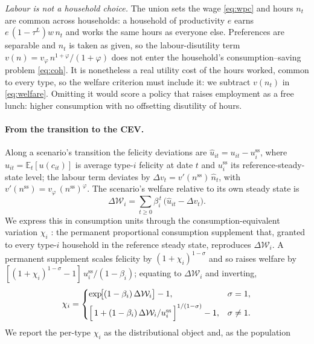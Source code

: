 \emph{Labour is not a household choice.} The union sets the wage \eqref{eq:wpc} and
hours $n_t$ are common across households: a household of productivity $e$ earns
$e\,(1-\tau^L)w\,n_t$ and works the same hours as everyone else. Preferences are
separable and $n_t$ is taken as given, so the labour-disutility term
$v(n)=v_\varphi\,n^{1+\varphi}/(1+\varphi)$ does not enter the household's
consumption--saving problem \eqref{eq:coh}. It is nonetheless a real utility cost of
the hours worked, common to every type, so the welfare criterion must include it: we
subtract $v(n_t)$ in \eqref{eq:welfare}. Omitting it would score a policy that raises
employment as a free lunch: higher consumption with no offsetting disutility of
hours.

\paragraph{From the transition to the CEV.} Along a scenario's transition the
felicity deviations are $\widehat{u}_{it}=u_{it}-u^{\mathrm{ss}}_i$, where
$u_{it}=\mathbb{E}_t[u(c_{it})]$ is average type-$i$ felicity at date $t$ and
$u^{\mathrm{ss}}_i$ its reference-steady-state level; the labour term deviates by
$\Delta v_t=v'(n^{\mathrm{ss}})\,\widehat{n}_t$, with
$v'(n^{\mathrm{ss}})=v_\varphi\,(n^{\mathrm{ss}})^{\varphi}$. The scenario's welfare
relative to its own steady state is
%
\begin{equation}
  \Delta\mathcal{W}_i=\sum_{t\ge0}\beta_i^{\,t}\,\bigl(\widehat{u}_{it}-\Delta v_t\bigr).
  \label{eq:dW}
\end{equation}
%
We express this in consumption units through the consumption-equivalent variation
$\chi_i$ \citep{Lucas1987}: the permanent proportional consumption supplement that,
granted to every type-$i$ household in the reference steady state, reproduces
$\Delta\mathcal{W}_i$. A permanent supplement scales felicity by
$(1+\chi_i)^{1-\sigma}$ and so raises welfare by
$[(1+\chi_i)^{1-\sigma}-1]\,u^{\mathrm{ss}}_i/(1-\beta_i)$; equating to
$\Delta\mathcal{W}_i$ and inverting,
%
\begin{equation}
  \chi_i=
  \begin{cases}
    \exp\!\bigl[(1-\beta_i)\,\Delta\mathcal{W}_i\bigr]-1, & \sigma=1,\\[4pt]
    \Bigl[\,1+(1-\beta_i)\,\Delta\mathcal{W}_i/u^{\mathrm{ss}}_i\,\Bigr]^{1/(1-\sigma)}-1, & \sigma\neq1.
  \end{cases}
  \label{eq:cev}
\end{equation}
%
We report the per-type $\chi_i$ as the distributional object and, as the population
